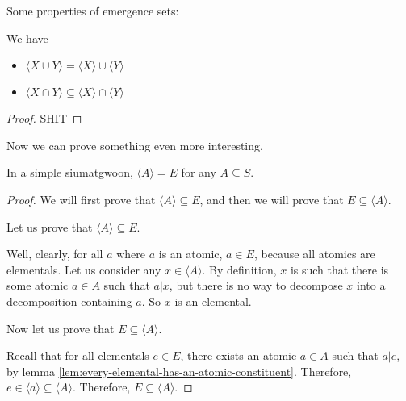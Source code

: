 Some properties of emergence sets: 
\begin{theorem}\label{thm:the-emergence-set-of-a-set-is-a-subset-of-the-set}
    We have
    \begin{itemize}
        \item $\langle X \cup Y \rangle = \langle X \rangle \cup \langle Y \rangle$
        \item $\langle X \cap Y \rangle \subseteq \langle X \rangle \cap \langle Y \rangle$
        
        
    \end{itemize}
\end{theorem}
\begin{proof}
    SHIT
\end{proof}






Now we can prove something even more interesting. 
\begin{theorem}\label{thm:hais-of-sets-are-siumatgwoons}
    In a simple siumatgwoon, $\langle A \rangle = E$ for any $A\subseteq S$.
\end{theorem}
\begin{proof}
    We will first prove that $\langle A \rangle \subseteq E$, and then we will prove that $E \subseteq \langle A \rangle$.

    Let us prove that $\langle A \rangle \subseteq E$.  

    Well, clearly, for all $a$ where $a$ is an atomic, $a \in E$, because all atomics are elementals. Let us consider any $x\in \langle A \rangle$. By definition, $x$ is such that there is some atomic $a\in A$ such that $a|x$, but there is no way to decompose $x$ into a decomposition containing $a$. So $x$ is an elemental. 

    Now let us prove that $E \subseteq \langle A \rangle$.

Recall that for all elementals $e\in E$, there exists an atomic $a\in A$ such that $a|e$, by lemma \ref{lem:every-elemental-has-an-atomic-constituent}. Therefore, $e\in \langle a \rangle \subseteq \langle A \rangle$. Therefore, $E \subseteq \langle A \rangle$.
\end{proof}
